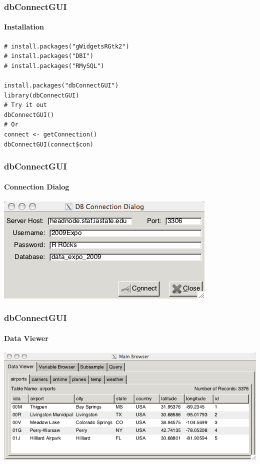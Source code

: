 \documentclass[xcolor=dvipsnames]{beamer}
\begin{document}
%
%  
%  
%

\begin{frame}[fragile]
  \frametitle{dbConnectGUI}
  \framesubtitle{Installation}

\begin{verbatim}
# install.packages("gWidgetsRGtk2")
# install.packages("DBI")
# install.packages("RMySQL")

install.packages("dbConnectGUI")
library(dbConnectGUI)
# Try it out
dbConnectGUI()
# Or
connect <- getConnection()
dbConnectGUI(connect$con)
\end{verbatim}


\end{frame}


\begin{frame}
  \frametitle{dbConnectGUI}
  \framesubtitle{Connection Dialog}
  \centering
  \includegraphics[width=.70\linewidth]{./images/dbconnect-dialog.png}

\end{frame}

\begin{frame}
  \frametitle{dbConnectGUI}
  \framesubtitle{Data Viewer}
  \centering
  \includegraphics[width=.85\linewidth]{./images/db-lineviewer.png}

\end{frame}
\end{document}

